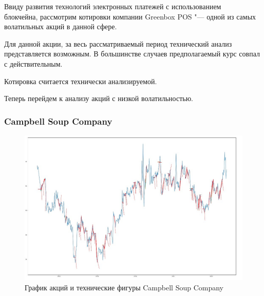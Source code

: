\documentclass[bachelor, och, coursework]{SCWorks}
\begin{document}
    Ввиду развития технологий электронных платежей с использованием \\блокчейна,
    рассмотрим котировки компании Greenbox POS "--- одной из самых волатильных 
    акций в данной сфере.

    Для данной акции, за весь рассматриваемый период технический анализ 
    представляется возможным. В большинстве случаев предполагаемый курс совпал с 
    действительным.
    
    Котировка считается технически анализируемой.

    Теперь перейдем к анализу акций с низкой волатильностью.

    \subsubsection{Campbell Soup Company}
    
    \begin{figure}[H]
        \centering
        \includegraphics[width=\textwidth]{pic/CPB.jpg}
        \caption{График акций и технические фигуры Campbell Soup Company}
    \end{figure}
   
\end{document}
